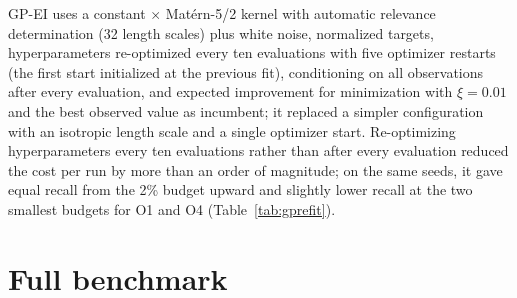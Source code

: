 \documentclass[journal=jcisd8,manuscript=suppinfo]{achemso}
\newcommand{\gs}{Graph-SOCIAL}
\begin{document}
GP-EI uses a constant $\times$ Mat\'ern-5/2 kernel with automatic relevance determination (32 length scales) plus white noise, normalized targets, hyperparameters re-optimized every ten evaluations with five optimizer restarts (the first start initialized at the previous fit), conditioning on all observations after every evaluation, and expected improvement for minimization with $\xi=0.01$ and the best observed value as incumbent; it replaced a simpler configuration with an isotropic length scale and a single optimizer start. Re-optimizing hyperparameters every ten evaluations rather than after every evaluation reduced the cost per run by more than an order of magnitude; on the same seeds, it gave equal recall from the 2\% budget upward and slightly lower recall at the two smallest budgets for O1 and O4 (Table~\ref{tab:gprefit}).

\begin{table}[h]
\caption{GP-EI final recall with hyperparameters re-optimized after every evaluation versus every ten evaluations (same 30 seeds; two-sided paired Wilcoxon). Budgets of 0.5--2\%.}
\label{tab:gprefit}
\small

\end{table}

\section{Full benchmark}

\begingroup\scriptsize\setlength{\tabcolsep}{2pt}

\endgroup

\begin{table}[h]
\caption{Hit sets (1\% of each objective's pool with the lowest objective value).}
\label{tab:hits}
\small

\end{table}

\begin{table}[h]
\caption{\gs{} (GS) against each baseline: number of the \nCells{} objective--budget cells in which GS is significantly better, not significantly different or significantly worse (paired Wilcoxon, Holm-corrected, final recall), with Cliff's $\delta$; and mean Friedman ranks.}
\label{tab:pairwise}
\small
\qquad
\end{table}

\begin{table}[h]
\caption{Random search against its analytical expectation ($E[\mathrm{recall}]=B/N$; exact two-sided test on the total number of hits over 30 seeds).}
\label{tab:random}
\scriptsize
\begin{adjustbox}{max width=\linewidth}\end{adjustbox}
\end{table}
\end{document}
